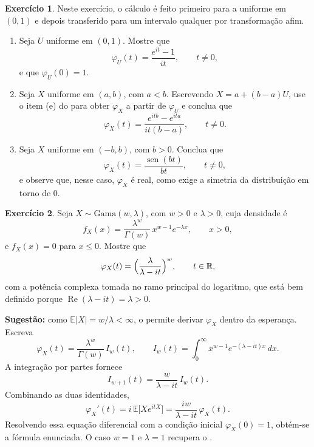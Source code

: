 \documentclass[12pt,portuguese]{article}
\theoremstyle{definition}
\theoremstyle{plainexercise}
\newtheorem{exercise}{Exercício}
\theoremstyle{starredexercise}
\theoremstyle{definition}
\renewcommand{\sin}{\operatorname{sen}}
\begin{document}
\begin{exercise}\label{exercise:gw-7-96}
Neste exercício, o cálculo é feito primeiro para a uniforme em $(0,1)$ e
depois transferido para um intervalo qualquer por transformação afim.
\begin{enumerate}[label=(\alph*)]
\item Seja $U$ uniforme em $(0,1)$. Mostre que
\[
\varphi_U(t)=\frac{e^{it}-1}{it}, \qquad t\neq0,
\]
e que $\varphi_U(0)=1$.

\item Seja $X$ uniforme em $(a,b)$, com $a<b$. Escrevendo
$X=a+(b-a)U$, use o item (e) do  para obter
$\varphi_X$ a partir de $\varphi_U$ e conclua que
\[
\varphi_X(t)=\frac{e^{itb}-e^{ita}}{it(b-a)}, \qquad t\neq0.
\]

\item Seja $X$ uniforme em $(-b,b)$, com $b>0$. Conclua que
\[
\varphi_X(t)=\frac{\sin(bt)}{bt}, \qquad t\neq0,
\]
e observe que, nesse caso, $\varphi_X$ é real, como exige a simetria da
distribuição em torno de $0$.
\end{enumerate}
\end{exercise}

\begin{exercise}\label{exercise:gw-7-97}
Seja $X\sim\mathrm{Gama}(w,\lambda)$, com $w>0$ e $\lambda>0$, cuja densidade
é
\[
f_X(x)=\frac{\lambda^{w}}{\Gamma(w)}\,x^{w-1}e^{-\lambda x},
\qquad x>0,
\]
e $f_X(x)=0$ para $x\leqslant0$. Mostre que
\[
\varphi_X(t)=\Bigl(\frac{\lambda}{\lambda-it}\Bigr)^{w},
\qquad t\in\mathbb{R},
\]
com a potência complexa tomada no ramo principal do logaritmo, que está bem
definido porque $\operatorname{Re}(\lambda-it)=\lambda>0$.

\noindent\textbf{Sugestão:} como $\mathbb{E}|X|=w/\lambda<\infty$, o
 permite derivar $\varphi_X$ dentro da esperança.
Escreva
\[
\varphi_X(t)=\frac{\lambda^{w}}{\Gamma(w)}\,I_w(t),
\qquad
I_w(t)=\int_0^{\infty}x^{w-1}e^{-(\lambda-it)x}\,dx .
\]
A integração por partes fornece
\[
I_{w+1}(t)=\frac{w}{\lambda-it}\,I_w(t).
\]
Combinando as duas identidades,
\[
\varphi_X'(t)=i\,\mathbb{E}\bigl[Xe^{itX}\bigr]
=\frac{iw}{\lambda-it}\,\varphi_X(t).
\]
Resolvendo essa equação diferencial com a condição inicial $\varphi_X(0)=1$,
obtém-se a fórmula enunciada. O caso $w=1$ e $\lambda=1$ recupera o
.
\end{exercise}
\end{document}
